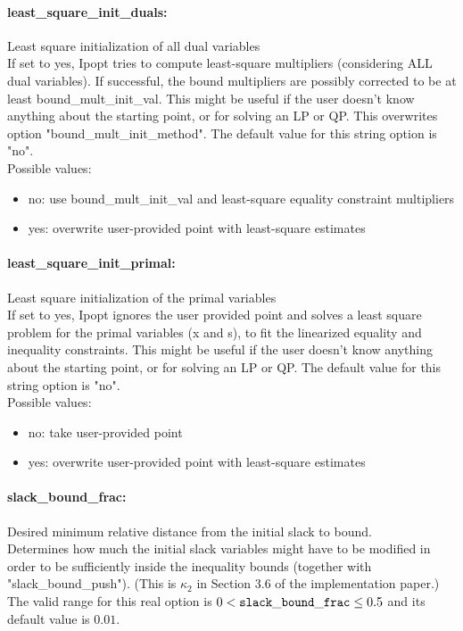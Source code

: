 \paragraph{least\_square\_init\_duals:}\label{sec:least_square_init_duals} Least square initialization of all dual variables $\;$ \\
 If set to yes, Ipopt tries to compute
least-square multipliers (considering ALL dual
variables).  If successful, the bound multipliers
are possibly corrected to be at least
bound\_mult\_init\_val. This might be useful if
the user doesn't know anything about the starting
point, or for solving an LP or QP.  This
overwrites option "bound\_mult\_init\_method".
The default value for this string option is "no".
\\ 
Possible values:
\begin{itemize}
   \item no: use bound\_mult\_init\_val and least-square
equality constraint multipliers
   \item yes: overwrite user-provided point with least-square
estimates
\end{itemize}

\paragraph{least\_square\_init\_primal:}\label{sec:least_square_init_primal} Least square initialization of the primal variables $\;$ \\
 If set to yes, Ipopt ignores the user provided
point and solves a least square problem for the
primal variables (x and s), to fit the linearized
equality and inequality constraints.  This might
be useful if the user doesn't know anything about
the starting point, or for solving an LP or QP.
The default value for this string option is "no".
\\ 
Possible values:
\begin{itemize}
   \item no: take user-provided point
   \item yes: overwrite user-provided point with least-square
estimates
\end{itemize}

\paragraph{slack\_bound\_frac:}\label{sec:slack_bound_frac} Desired minimum relative distance from the initial slack to bound. $\;$ \\
 Determines how much the initial slack variables
might have to be modified in order to be
sufficiently inside the inequality bounds
(together with "slack\_bound\_push").  (This is
$\kappa_2$ in Section 3.6 of the implementation paper.) The valid range for this real option is 
$0 <  {\tt slack\_bound\_frac } \le 0.5$
and its default value is $0.01$.


